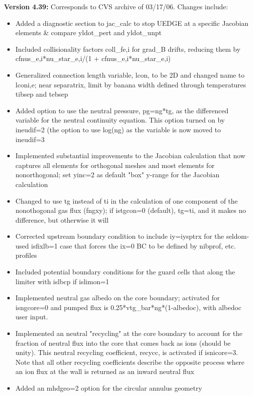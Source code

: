 \documentclass [12pt]{article}
\begin{document}
\noindent\textbf{Version 4.39:} Corresponds to CVS archive of 03/17/06.  
Changes include:
\begin{itemize}
   \item Added a diagnostic section to jac\_calc to stop UEDGE at
          a specific Jacobian elements \& compare yldot\_pert and
	  yldot\_unpt
   \item Included collisionality factors coll\_fe,i for grad\_B
	  drifts, reducing them by \hfil \break
	  cfnus\_e,i*nu\_star\_e,i/(1 + cfnus\_e,i*nu\_star\_e,i)
   \item Generalized connection length variable, lcon, to be 2D and
	  changed name to lconi,e; near separatrix, limit by banana
	  width defined through temperatures tibsep and tebsep 
   \item Added option to use the neutral pressure, pg=ng*tg, as the
	  differenced variable for the neutral continuity equation.
	  This option turned on by ineudif=2 (the option to use 
	  log(ng) as the variable is now moved to ineudif=3
   \item Implemented substantial improvements to the Jacobian 
	  calculation that now captures all elements for orthogonal
	  meshes and most elements for nonorthogonal; set yinc=2 
	  as default "box" y-range for the Jacobian calculation 
   \item Changed to use tg instead of ti in the calculation
	  of one component of the nonothogonal gas flux (fngxy);
	  if istgcon=0 (default), tg=ti, and it makes no difference,
	  but otherwise it will
   \item Corrected upstream boundary condition to include iy=iysptrx
	  for the seldom-used isfixlb=1 case that forces the ix=0 BC
	  to be defined by nibprof, etc. profiles 
   \item Included potential boundary conditions for the guard cells
	  that along the limiter with islbcp if islimon=1 
   \item Implemented neutral gas albedo on the core boundary; 
	  activated for isngcore=0 and pumped flux is
	  0.25*vtg\_bar*ng*(1-albedoc), with albedoc user input.
   \item Implemented an neutral "recycling" at the core boundary
	  to account for the fraction of neutral flux into the core
	  that comes back as ions (should be unity).  This neutral
	  recycling coefficient, recycc, is activated if isnicore=3.
	  Note that all other recycling coefficients describe the
	  opposite process where an ion flux at the wall is returned
	  as an inward neutral flux 
   \item Added an mhdgeo=2 option for the circular annulus geometry 

\end{itemize}
\end{document}
